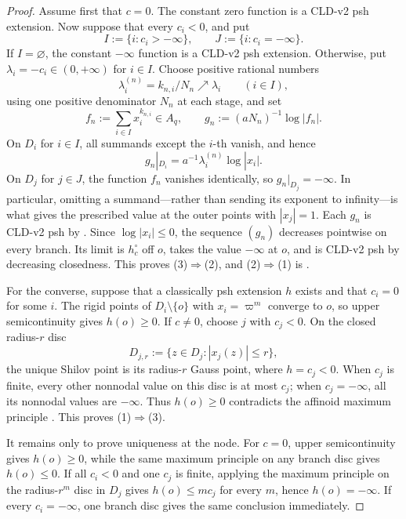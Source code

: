 \begin{proof}
Assume first that \(c=0\).  The constant zero function is a CLD-v2 psh
extension.  Now suppose that every \(c_i<0\), and put
\[
 I:=\{i:c_i> -\infty\},\qquad J:=\{i:c_i=-\infty\}.
\]
If \(I=\varnothing\), the constant \(-\infty\) function is a CLD-v2 psh
extension.  Otherwise, put \(\lambda_i=-c_i\in(0,+\infty)\) for
\(i\in I\).  Choose positive rational numbers
\[
       \lambda_i^{(n)}=k_{n,i}/N_n\nearrow\lambda_i
       \qquad(i\in I),
\]
using one positive denominator \(N_n\) at each stage, and set
\[
                  f_n:=\sum_{i\in I}x_i^{k_{n,i}}\in A_q,
       \qquad g_n:=(aN_n)^{-1}\log|f_n|.
\]
On \(D_i\) for \(i\in I\), all summands except the \(i\)-th vanish, and
hence
\[
                  g_n|_{D_i}=a^{-1}\lambda_i^{(n)}\log|x_i|.
\]
On \(D_j\) for \(j\in J\), the function \(f_n\) vanishes identically, so
\(g_n|_{D_j}=-\infty\).  In particular, omitting a summand---rather than
sending its exponent to infinity---is what gives the prescribed value at
the outer points with \(|x_j|=1\).
Each \(g_n\) is CLD-v2 psh by
.  Since
\(\log|x_i|\leq0\), the sequence \((g_n)\) decreases pointwise on every
branch.  Its limit is \(h_c^\circ\) off \(o\), takes the value \(-\infty\)
at \(o\), and is CLD-v2 psh by decreasing closedness.  This proves
(3)\(\Rightarrow\)(2), and (2)\(\Rightarrow\)(1) is
.

For the converse, suppose that a classically psh extension \(h\) exists and
that \(c_i=0\) for some \(i\).  The rigid points of \(D_i\setminus\{o\}\)
with \(x_i=\varpi^m\) converge to \(o\), so upper semicontinuity gives
\(h(o)\geq0\).  If \(c\ne0\), choose \(j\) with \(c_j<0\).  On the closed
radius-\(r\) disc
\[
                    D_{j,r}:=\{z\in D_j:|x_j(z)|\leq r\},
\]
the unique Shilov point is its radius-\(r\) Gauss point, where \(h=c_j<0\).
When \(c_j\) is finite, every other nonnodal value on this disc is at most
\(c_j\); when \(c_j=-\infty\), all its nonnodal values are \(-\infty\).
Thus \(h(o)\geq0\) contradicts the affinoid maximum principle
\cite[Theorem~6.4]{GR25Classical}.  This proves (1)\(\Rightarrow\)(3).

It remains only to prove uniqueness at the node.  For \(c=0\), upper
semicontinuity gives \(h(o)\geq0\), while the same maximum principle on any
branch disc gives \(h(o)\leq0\).  If all \(c_i<0\) and one \(c_j\) is
finite, applying the maximum principle on the radius-\(r^m\) disc in
\(D_j\) gives \(h(o)\leq m c_j\) for every \(m\), hence
\(h(o)=-\infty\).  If every \(c_i=-\infty\), one branch disc gives the same
conclusion immediately.


\end{proof}
